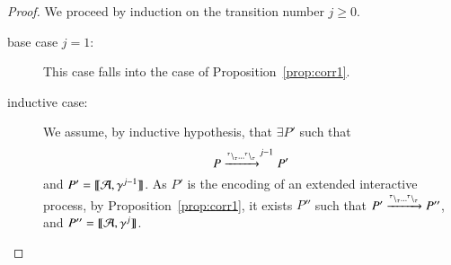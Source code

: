 \begin{proof}
We proceed by induction on the transition number $j \geq 0$.
\begin{description}
\item[base case $j=1$:]
 This case falls into the case of Proposition~\ref{prop:corr1}.
\item[inductive case:]
We assume, by inductive hypothesis, that $\exists P'$ such that 
$$P \xrightarrow{{}^{\tau} \backslash_{\tau}\dots {}^{\tau} \backslash_{\tau}}^{j-1} P'$$ 
and $P' = \llbracket{\cal A},\gamma^{j-1}\rrbracket$.
As $P'$ is the encoding of an extended interactive process, by Proposition~\ref{prop:corr1}, it exists $P''$  such that $P' \xrightarrow{{}^{\tau} \backslash_{\tau}\dots{}^{\tau} \backslash_{\tau}} P''$,
 and $P'' = \llbracket{\cal A},\gamma^j\rrbracket$. 
\end{description}
\end{proof}

\propcompluno*

